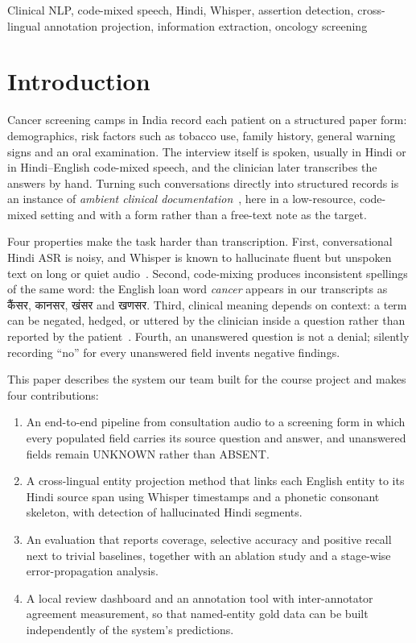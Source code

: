 \documentclass[conference]{IEEEtran}
\begin{document}
\begin{IEEEkeywords}
Clinical NLP, code-mixed speech, Hindi, Whisper, assertion detection, cross-lingual annotation projection, information extraction, oncology screening
\end{IEEEkeywords}

\section{Introduction}
Cancer screening camps in India record each patient on a structured paper form: demographics, risk factors such as tobacco use, family history, general warning signs and an oral examination. The interview itself is spoken, usually in Hindi or in Hindi–English code-mixed speech, and the clinician later transcribes the answers by hand. Turning such conversations directly into structured records is an instance of \emph{ambient clinical documentation}~\cite{aci}, here in a low-resource, code-mixed setting and with a form rather than a free-text note as the target.

Four properties make the task harder than transcription. First, conversational Hindi ASR is noisy, and Whisper is known to hallucinate fluent but unspoken text on long or quiet audio~\cite{careless}. Second, code-mixing produces inconsistent spellings of the same word: the English loan word \emph{cancer} appears in our transcripts as {\dev कैंसर, कानसर, खंसर} and {\dev खणसर}. Third, clinical meaning depends on context: a term can be negated, hedged, or uttered by the clinician inside a question rather than reported by the patient~\cite{negex,context}. Fourth, an unanswered question is not a denial; silently recording “no” for every unanswered field invents negative findings.

This paper describes the system our team built for the course project and makes four contributions:

\begin{enumerate}
\item An end-to-end pipeline from consultation audio to a screening form in which every populated field carries its source question and answer, and unanswered fields remain UNKNOWN rather than ABSENT.
\item A cross-lingual entity projection method that links each English entity to its Hindi source span using Whisper timestamps and a phonetic consonant skeleton, with detection of hallucinated Hindi segments.
\item An evaluation that reports coverage, selective accuracy and positive recall next to trivial baselines, together with an ablation study and a stage-wise error-propagation analysis.
\item A local review dashboard and an annotation tool with inter-annotator agreement measurement, so that named-entity gold data can be built independently of the system's predictions.
\end{enumerate}
\end{document}
